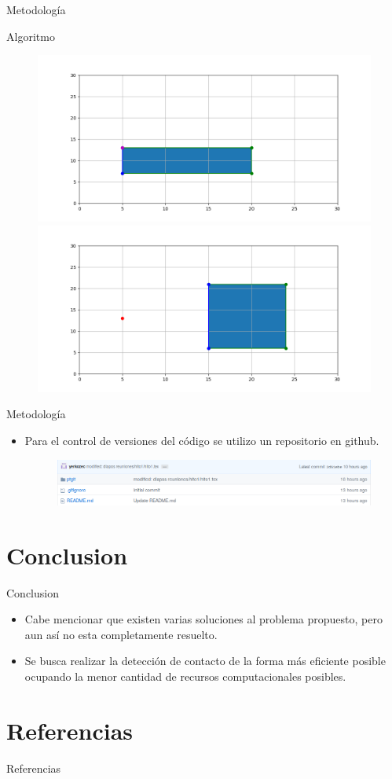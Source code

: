 \documentclass[11pt]{beamer}
\begin{document}
\begin{frame}{Metodología}
 \begin{block}{Algoritmo}
\begin{figure}
 \includegraphics[width = 0.6\linewidth]{img/Figura_vertice}
 \includegraphics[width = 0.6\linewidth]{img/figura_fuera}
\end{figure}
 \end{block}
\end{frame}

\begin{frame}{Metodología}
\begin{itemize}
    \item Para el control de versiones del código se utilizo un repositorio en github.
    \begin{figure}
      \includegraphics[width = 1\linewidth]{img/github}
    \end{figure}

\end{itemize}
\end{frame}

\section{Conclusion}
\begin{frame}{Conclusion}
 \begin{itemize}
  \item Cabe mencionar que existen varias soluciones al problema propuesto, pero aun así no esta completamente resuelto.
  \item Se busca realizar la detección de contacto de la forma más eficiente posible ocupando la menor cantidad de recursos computacionales posibles.
 \end{itemize}
\end{frame}

\section{Referencias}
\begin{frame}{Referencias}
\medskip


\end{frame}


\begin{frame}[plain]
  \titlepage
\end{frame}
\end{document}
